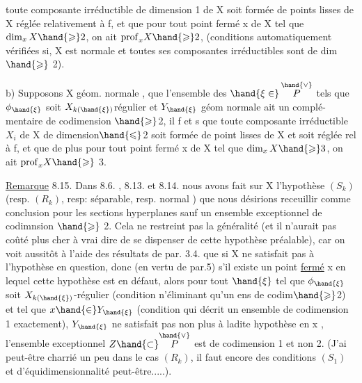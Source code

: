 

toute composante irréductible  de dimension 1  de X soit 
formée de points lisses de X   réglée relativement à f, et que
pour tout point fermé  x de X tel que $\dim_x X \hand{\geqslant} 2$, on ait $\mathrm{prof}_x X \hand{\geqslant} 2$,
(conditions automatiquement vérifiées si, X est  normale et toutes ses
composantes irréductibles sont de dim$\hand{\geqslant}$ 2).

b) Supposons X géom. normale ,  que l'ensemble  des $\hand{\xi \in}\, \overset{\hand{\vee}}{P}$
tels que $\phi_{\hand{\xi}}$ soit $X_{k(\hand{\xi})}$\hand{-}régulier et $Y_{\hand{\xi}}$  géom normale ait un complé-%
mentaire de codimension $\hand{\geqslant}$2, il f et s que  toute composante
irréductible $X_i$ de X de dimension$\hand{\leqslant}$2 soit formée de point lisses de
X et soit réglée rel à f, et que de plus pour tout point fermé x de X
tel que $\dim_x X \hand{\geqslant} 3$, on ait $\mathrm{prof}_x X \hand{\geqslant}$ 3.


\uline{Remarque} 8.15. Dans 8.6. , 8.13. et 8.14. nous avons fait sur X
l'hypothèse $(S_k)$ (resp. $(R_k)$, resp: séparable, resp.  normal ) que
nous désirions receuillir comme conclusion pour les sections hyperplanes
sauf  un ensemble exceptionnel de codimnsion $\hand{\geqslant}$ 2. Cela ne restreint
pas la généralité (et il n'aurait pas coûté plus cher à vrai dire
de se dispenser de cette hypothèse préalable), car on voit aussitôt
à l'aide des résultats de par. 3.4.  que si X ne satisfait pas à
l'hypothèse en question, donc (en vertu de par.5) s'il existe un point
\uline{fermé} x en lequel cette hypothèse est en défaut, alors pour tout $\hand{\xi}$ tel
que $\phi_{\hand{\xi}}$ soit $X_{k(\hand{\xi})}$-régulier (condition n'éliminant qu'un ens de codim$\hand{\geqslant}$2)
et tel que $x \hand{\in} Y_{\hand{\xi}}$ (condition qui décrit un ensemble de codimension 1
exactement), $Y_{\hand{\xi}}$ ne satisfait pas non plus à ladite hypothèse en x ,
 l'ensemble exceptionnel $Z \hand{\subset} \overset{\hand{\vee}}{P}$ est de codimension 1 et non 2.
(J'ai peut-être charrié un peu dans le cas $(R_k)$,  il faut encore
des conditions $(S_1)$ et d'équidimensionnalité peut-être.....).

